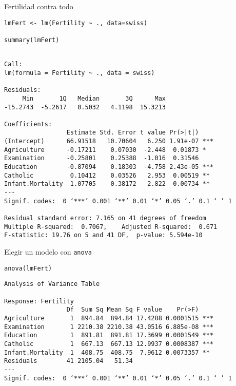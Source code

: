 \documentclass[xcolor={usenames,svgnames,dvipsnames}]{beamer}
\begin{document}
\begin{frame}[fragile,label={sec:org288f909}]{Fertilidad contra todo}
 \lstset{language=r,label= ,caption= ,captionpos=b,numbers=none}
\begin{lstlisting}
lmFert <- lm(Fertility ~ ., data=swiss)

summary(lmFert)
\end{lstlisting}

\begin{verbatim}

Call:
lm(formula = Fertility ~ ., data = swiss)

Residuals:
     Min       1Q   Median       3Q      Max 
-15.2743  -5.2617   0.5032   4.1198  15.3213 

Coefficients:
                 Estimate Std. Error t value Pr(>|t|)    
(Intercept)      66.91518   10.70604   6.250 1.91e-07 ***
Agriculture      -0.17211    0.07030  -2.448  0.01873 *  
Examination      -0.25801    0.25388  -1.016  0.31546    
Education        -0.87094    0.18303  -4.758 2.43e-05 ***
Catholic          0.10412    0.03526   2.953  0.00519 ** 
Infant.Mortality  1.07705    0.38172   2.822  0.00734 ** 
---
Signif. codes:  0 ‘***’ 0.001 ‘**’ 0.01 ‘*’ 0.05 ‘.’ 0.1 ‘ ’ 1

Residual standard error: 7.165 on 41 degrees of freedom
Multiple R-squared:  0.7067,	Adjusted R-squared:  0.671 
F-statistic: 19.76 on 5 and 41 DF,  p-value: 5.594e-10
\end{verbatim}
\end{frame}

\begin{frame}[fragile,label={sec:orgeea075a}]{Elegir un modelo con \texttt{anova}}
 \lstset{language=r,label= ,caption= ,captionpos=b,numbers=none}
\begin{lstlisting}
anova(lmFert)
\end{lstlisting}

\begin{verbatim}
Analysis of Variance Table

Response: Fertility
                 Df  Sum Sq Mean Sq F value    Pr(>F)    
Agriculture       1  894.84  894.84 17.4288 0.0001515 ***
Examination       1 2210.38 2210.38 43.0516 6.885e-08 ***
Education         1  891.81  891.81 17.3699 0.0001549 ***
Catholic          1  667.13  667.13 12.9937 0.0008387 ***
Infant.Mortality  1  408.75  408.75  7.9612 0.0073357 ** 
Residuals        41 2105.04   51.34                      
---
Signif. codes:  0 ‘***’ 0.001 ‘**’ 0.01 ‘*’ 0.05 ‘.’ 0.1 ‘ ’ 1
\end{verbatim}
\end{frame}
\end{document}
